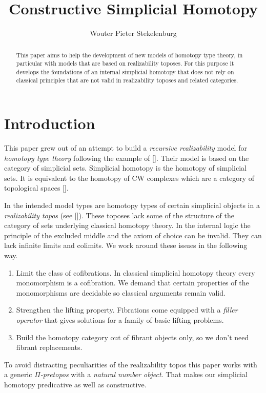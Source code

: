 \documentclass{tac}
\title{Constructive Simplicial Homotopy}
\author{Wouter Pieter Stekelenburg}
\newcommand\hide[1]{}
\newcommand\citep[1]{[\cite{#1}]}
\begin{document}
\begin{abstract} This paper aims to help the development of new models of homotopy type theory, in particular with models that are based on realizability toposes. For this purpose it develops the foundations of an internal simplicial homotopy that does not rely on classical principles that are not valid in realizability toposes and related categories.\end{abstract}

\hide{
Three papers:
-simplicial homotopy
-complete categories [how they are preserved]
-the realizability model of HOTT [how to get a fibrant object out of a category]

Idee: reverse the order. definitions--theorem--lemmas. That way the purpose of the lemmas is set up from the start.
}

\maketitle

\section*{Introduction}
This paper grew out of an attempt to build a \emph{recursive realizability} model for \emph{homotopy type theory} following the example of \citep{KLV12}. Their model is based on the category of simplicial sets. Simplicial homotopy is the homotopy of simplicial sets. It is equivalent to the homotopy of CW complexes which are a category of topological spaces \citep{Hovey99,GJSHT}.

In the intended model types are homotopy types of certain simplicial objects in a \emph{realizability topos} (see \citep{MR2479466}). These toposes lack some of the structure of the category of sets underlying classical homotopy theory. In the internal logic the principle of the excluded middle and the axiom of choice can be invalid. They can lack infinite limits and colimits. We work around these issues in the following way.
\begin{enumerate}
\item Limit the class of cofibrations. In classical simplicial homotopy theory every mono\-morphism is a cofibration. We demand that certain properties of the monomorphisms are decidable so classical arguments remain valid.
\item Strengthen the lifting property. Fibrations come equipped with a \emph{filler operator} that gives solutions for a family of basic lifting problems.
\item Build the homotopy category out of fibrant objects only, so we don't need fibrant replacements.
\end{enumerate}
To avoid distracting peculiarities of the realizability topos this paper works with a generic \emph{$\Pi$-pretopos} with a \emph{natural number object}. That makes our simplicial homotopy predicative as well as constructive.
\end{document}

